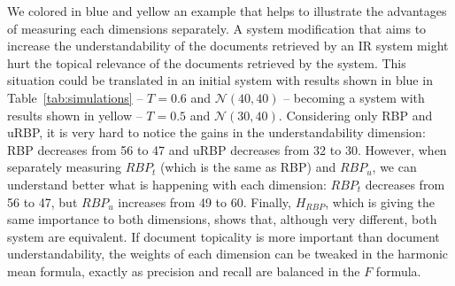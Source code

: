 We colored in blue and yellow an example that helps to illustrate the advantages of measuring each dimensions separately.
A system modification that aims to increase the understandability of the documents retrieved by an IR system might hurt the topical relevance of the documents retrieved by the system.
This situation could be translated in an initial system with results shown in blue in Table~\ref{tab:simulations} -- $T=0.6$ and $\mathcal{N}(40,40)$ -- 
becoming a system with results shown in yellow -- $T=0.5$ and $\mathcal{N}(30,40)$. 
Considering only RBP and uRBP, it is very hard to notice the gains in the understandability dimension: RBP decreases from 56 to 47 and uRBP decreases from 32 to 30.
However, when separately measuring $RBP_t$ (which is the same as RBP) and $RBP_u$, we can understand better what is happening with each dimension: $RBP_t$ decreases from 56 to 47, but $RBP_u$ increases from 49 to 60. Finally, $H_{RBP}$, which is giving the same importance to both dimensions, shows that, although very different, both system are equivalent. If document topicality is more important than document understandability, the weights of each dimension can be tweaked in the harmonic mean formula, exactly as precision and recall are balanced in the $F$ formula.



 


